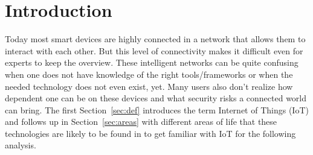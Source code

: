 

\chapter{Introduction}\label{ch:introduction}
Today most smart devices are highly connected in a network that allows them to interact with each other. But this level of connectivity makes it difficult even for experts to keep the overview. These intelligent networks can be quite confusing when one does not have knowledge of the right tools/frameworks or when the needed technology does not even exist, yet. Many users also don't realize how dependent one can be on these devices and what security risks a connected world can bring. The first Section~\ref{sec:def} introduces the term Internet of Things (IoT) and follows up in Section~\ref{sec:areas} with different areas of life that these technologies are likely to be found in to get familiar with IoT for the following analysis.


